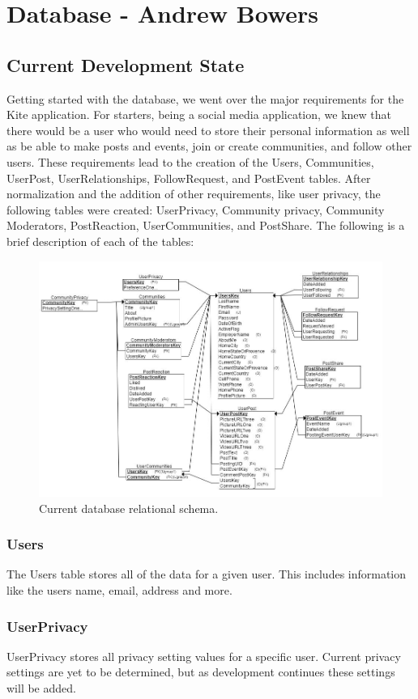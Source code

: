 \documentclass[compsoc, 10, draftclsnofoot, onecolumn]{IEEEtran}
\begin{document}
\section{Database - Andrew Bowers}
\subsection{Current Development State}
\indent Getting started with the database, we went over the major requirements for the Kite application. For starters, being a social media application, we knew that there would be a user who would need to store their personal information as well as be able to make posts and events, join or create communities, and follow other users. These requirements lead to the creation of the Users, Communities, UserPost, UserRelationships, FollowRequest, and PostEvent tables. After normalization and the addition of other requirements, like user privacy, the following tables were created: UserPrivacy, Community privacy, Community Moderators, PostReaction, UserCommunities, and PostShare. The following is a brief description of each of the tables:
\FloatBarrier
\begin{figure}[h]
  \includegraphics[width=\linewidth]{database.JPG}
  \caption{Current database relational schema.}
\end{figure}
\FloatBarrier
\subsubsection{Users} The Users table stores all of the data for a given user. This includes information like the users name, email, address and more. 
\subsubsection{UserPrivacy} UserPrivacy stores all privacy setting values for a specific user. Current privacy settings are yet to be determined, but as development continues these settings will be added.   
\end{document}

